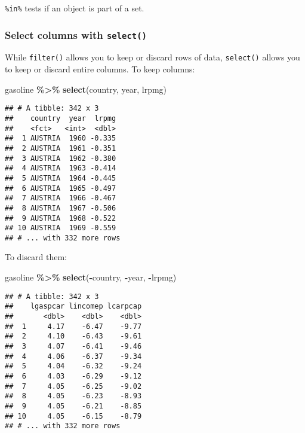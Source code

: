 \documentclass[
]{article}
\newenvironment{Shaded}{\begin{snugshade}}{\end{snugshade}}
\newcommand{\KeywordTok}[1]{\textcolor[rgb]{0.13,0.29,0.53}{\textbf{#1}}}
\newcommand{\NormalTok}[1]{#1}
\newcommand{\OperatorTok}[1]{\textcolor[rgb]{0.81,0.36,0.00}{\textbf{#1}}}
\newcommand{\StringTok}[1]{\textcolor[rgb]{0.31,0.60,0.02}{#1}}
\begin{document}
\texttt{\%in\%} tests if an object is part of a set.

\hypertarget{select-columns-with-select}{%
\subsubsection{\texorpdfstring{Select columns with \texttt{select()}}{Select columns with select()}}\label{select-columns-with-select}}

While \texttt{filter()} allows you to keep or discard rows of data, \texttt{select()}
allows you to keep or discard entire columns. To keep columns:

\begin{Shaded}
\begin{Highlighting}[]
\NormalTok{gasoline }\OperatorTok{\%\textgreater{}\%}\StringTok{ }\KeywordTok{select}\NormalTok{(country, year, lrpmg)}
\end{Highlighting}
\end{Shaded}

\begin{verbatim}
## # A tibble: 342 x 3
##    country  year  lrpmg
##    <fct>   <int>  <dbl>
##  1 AUSTRIA  1960 -0.335
##  2 AUSTRIA  1961 -0.351
##  3 AUSTRIA  1962 -0.380
##  4 AUSTRIA  1963 -0.414
##  5 AUSTRIA  1964 -0.445
##  6 AUSTRIA  1965 -0.497
##  7 AUSTRIA  1966 -0.467
##  8 AUSTRIA  1967 -0.506
##  9 AUSTRIA  1968 -0.522
## 10 AUSTRIA  1969 -0.559
## # ... with 332 more rows
\end{verbatim}

To discard them:

\begin{Shaded}
\begin{Highlighting}[]
\NormalTok{gasoline }\OperatorTok{\%\textgreater{}\%}\StringTok{ }\KeywordTok{select}\NormalTok{(}\OperatorTok{{-}}\NormalTok{country, }\OperatorTok{{-}}\NormalTok{year, }\OperatorTok{{-}}\NormalTok{lrpmg)}
\end{Highlighting}
\end{Shaded}

\begin{verbatim}
## # A tibble: 342 x 3
##    lgaspcar lincomep lcarpcap
##       <dbl>    <dbl>    <dbl>
##  1     4.17    -6.47    -9.77
##  2     4.10    -6.43    -9.61
##  3     4.07    -6.41    -9.46
##  4     4.06    -6.37    -9.34
##  5     4.04    -6.32    -9.24
##  6     4.03    -6.29    -9.12
##  7     4.05    -6.25    -9.02
##  8     4.05    -6.23    -8.93
##  9     4.05    -6.21    -8.85
## 10     4.05    -6.15    -8.79
## # ... with 332 more rows
\end{verbatim}
\end{document}
